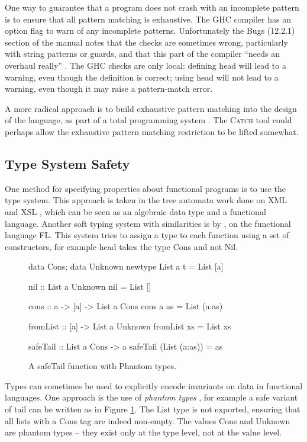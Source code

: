 \documentclass[preprint]{sigplanconf}
\newcommand{\C}[1]{\textsf{#1}}
\newcommand{\catch}{\textsc{Catch}}
\begin{document}
One way to guarantee that a program does not crash with an incomplete pattern is to ensure that all pattern matching is exhaustive. The GHC compiler \citep{ghc} has an option flag to warn of any incomplete patterns. Unfortunately the Bugs (12.2.1) section of the manual notes that the checks are sometimes wrong, particularly with string patterns or guards, and that this part of the compiler ``needs an overhaul really'' \citep{ghc}. The GHC checks are only local: defining \C{head} will lead to a warning, even though the definition is correct; using \C{head} will not lead to a warning, even though it may raise a pattern-match error.

A more radical approach is to build exhaustive pattern matching into the design of the language, as part of a total programming system \citep{turner:total}. The \catch{} tool could perhaps allow the exhaustive pattern matching restriction to be lifted somewhat.


\subsection{Type System Safety}

One method for specifying properties about functional programs is to use the type system. This approach is taken in the tree automata work done on XML and XSL \citep{static_xslt}, which can be seen as an algebraic data type and a functional language. Another soft typing system with similarities is by \citet{aiken:type_infer}, on the functional language FL. This system tries to assign a type to each function using a set of constructors, for example \C{head} takes the type \C{Cons} and not \C{Nil}.

\begin{figure}
\begin{code}
data Cons; data Unknown
newtype List a t = List [a]

nil :: List a Unknown
nil = List []

cons :: a -> [a] -> List a Cons
cons a as = List (a:as)

fromList :: [a] -> List a Unknown
fromList xs = List xs

safeTail :: List a Cons -> a
safeTail (List (a:as)) = as
\end{code}
\caption{A \C{safeTail} function with Phantom types.}
\label{fig:phantom}
\end{figure}

Types can sometimes be used to explicitly encode invariants on data in functional languages. One approach is the use of \textit{phantom types} \citep{fluet:phantom}, for example a safe variant of \C{tail} can be written as in Figure \ref{fig:phantom}. The \C{List} type is not exported, ensuring that all lists with a \C{Cons} tag are indeed non-empty. The values \C{Cons} and \C{Unknown} are phantom types -- they exist only at the type level, not at the value level.
\end{document}
